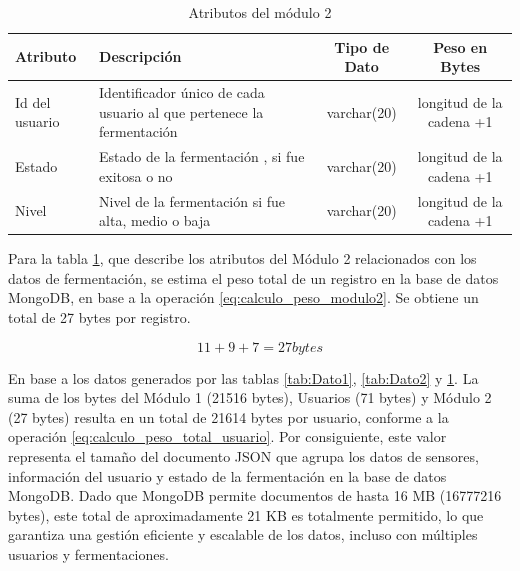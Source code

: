 \begin{table}[htbp]
    \centering
    \caption{Atributos del módulo 2} %
    \label{tab:Dato4}
    \footnotesize %

    \begin{tabular}{|>{\raggedright\arraybackslash}p{2.4cm}|>{\raggedright\arraybackslash}p{5.5cm}|c|c|}
        \hline
        \textbf{Atributo} & \textbf{Descripción} & \textbf{Tipo de Dato} & \textbf{Peso en Bytes} \\ \hline
        Id del usuario & Identificador único de cada usuario al que pertenece la fermentación & varchar(20) & longitud de la cadena +1 \\ \hline
        Estado & Estado de la fermentación , si fue exitosa o no & varchar(20) & longitud de la cadena +1 \\ \hline %
        Nivel & Nivel de la fermentación si fue alta, medio o baja & varchar(20) & longitud de la cadena +1 \\ \hline
    \end{tabular}
\end{table}

Para la tabla \ref{tab:Dato4}, que describe los atributos del Módulo 2 relacionados 
con los datos de fermentación, se estima el peso total de un registro en la base de
datos MongoDB, en base a la operación \ref{eq:calculo_peso_modulo2}. 
Se obtiene 
un total de 27 bytes por registro. 

\begin{equation}
11 + 9 + 7 = 27 bytes
\label{eq:calculo_peso_modulo2}
\end{equation}

En base a los datos generados por 
las tablas \ref{tab:Dato1}, 
\ref{tab:Dato2} y \ref{tab:Dato4}. La suma de los bytes del Módulo 1 (21516 bytes),
Usuarios (71 bytes) y Módulo 2 (27 bytes) resulta en un total de 21614 bytes por 
usuario, conforme a la operación \ref{eq:calculo_peso_total_usuario}. Por consiguiente, 
este valor representa el tamaño del documento JSON que agrupa los datos de sensores,
información del usuario y estado de la fermentación en la base de datos MongoDB. 
Dado que MongoDB permite documentos de hasta 16 MB (16777216 bytes), 
este total de aproximadamente 21 KB es totalmente permitido, 
lo que garantiza una gestión eficiente y escalable de los datos,
incluso con múltiples usuarios y fermentaciones.

